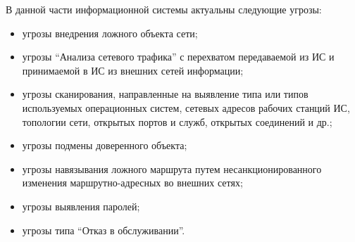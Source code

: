 В данной части информационной системы актуальны следующие угрозы:

\begin{itemize}
 \item угрозы внедрения ложного объекта сети;
 \item угрозы ``Анализа  сетевого  трафика'' с  перехватом  передаваемой из ИС и принимаемой в ИС из внешних сетей информации;
 \item угрозы  сканирования,  направленные  на  выявление типа  или  типов используемых операционных систем, сетевых адресов рабочих станций ИС, топологии сети, открытых портов и служб, открытых соединений и др.;
 \item угрозы подмены доверенного объекта;
 \item угрозы  навязывания  ложного  маршрута  путем  несанкционированного изменения  маршрутно-адресных  во внешних сетях;
 \item угрозы выявления паролей;
 \item угрозы типа ``Отказ в обслуживании''.
\end{itemize}